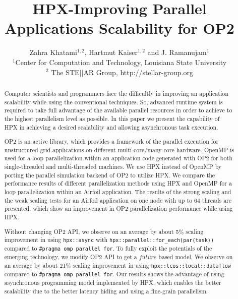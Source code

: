 \documentclass[conference]{IEEEtran}
\begin{document}





%

\title{HPX-Improving Parallel Applications Scalability for OP2}
\author{Zahra Khatami$^{1,2}$, Hartmut Kaiser$^{1,2}$ and J. Ramanujam$^{1}$ \\$^{1}$Center for Computation and Technology, Louisiana State University\\$^{2}$ The STE$||$AR Group, http://stellar-group.org
}
   
\maketitle

\begin{abstract}

Computer scientists and programmers face the difficultly in improving an application scalability while using the conventional techniques. So, advanced runtime system is required to take full advantage of the available parallel resources in order to achieve to the highest parallelism level as possible. In this paper we present the capability of HPX in achieving a desired scalability and allowing asynchronous task execution.

OP2 is an active library, which provides a framework of the parallel execution for unstructured grid applications on different multi-core/many-core hardware.  OpenMP is used for a loop parallelization within an application code generated with OP2 for both single-threaded and multi-threaded machines. We use HPX instead of OpenMP by porting the parallel simulation backend of OP2 to utilize HPX. We compare the performance results of different parallelization methods using HPX and OpenMP for a loop parallelization within an Airfoil application. The results of the strong scaling and the weak scaling tests for an Airfoil application on one node with up to 64 threads are presented, which show an improvement in OP2 parallelization performance while using HPX. 

Without changing OP2 API, we observe on an average by about 5\% scaling improvement in using \texttt{hpx::async} with \texttt{hpx::parallel::for\_each(par(task))} compared to \texttt{\#pragma omp parallel for}. To fully exploit the potentials of the emerging technology, we modify OP2 API to get a $future$ based model. We observe on an average by about 21\% scaling improvement in using \texttt{hpx::lcos::local::dataflow} compared to \texttt{\#pragma omp parallel for}. Our results shows the advantage of using asynchronous programming model implemented by HPX, which enables the better scalability due to the better latency hiding and using a fine-grain parallelism.




\end{abstract}
\end{document}
